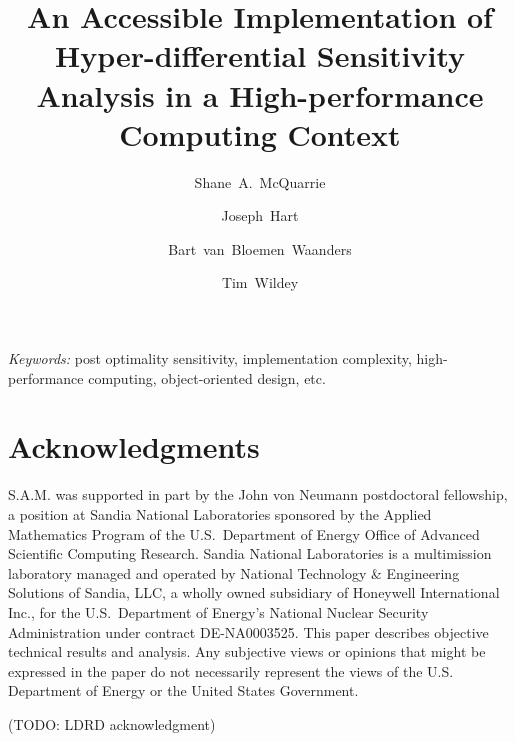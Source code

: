 \documentclass[10pt]{article}
\title{\Large\textbf{An Accessible Implementation of Hyper-differential Sensitivity Analysis in a High-performance Computing Context}}
\author[1]{Shane~A.~McQuarrie}
\author[1]{Joseph~Hart}
\author[1]{Bart~van~Bloemen~Waanders}
\author[2]{Tim~Wildey}
\affil[1]{\normalsize Scientific Machine Learning, Sandia National Laboratories}
\affil[1]{\normalsize Computational Mathematics, Sandia National Laboratories}
\date{}
\begin{document}
\thispagestyle{empty}

\maketitle

\vspace{-.5in}

\begin{abstract}
\noindent

\end{abstract}

\vspace{2mm}
\noindent \emph{Keywords:} post optimality sensitivity, implementation complexity, high-performance computing, object-oriented design, etc.




\section*{Acknowledgments}

S.A.M. was supported in part by the John von Neumann postdoctoral fellowship, a position at Sandia National Laboratories sponsored by the Applied Mathematics Program of the U.S.~Department of Energy Office of Advanced Scientific Computing Research.
Sandia National Laboratories is a multimission laboratory managed and operated by National Technology \& Engineering Solutions of Sandia, LLC, a wholly owned subsidiary of Honeywell International Inc., for the U.S.~Department of Energy's National Nuclear Security Administration under contract DE-NA0003525.
This paper describes objective technical results and analysis. Any subjective views or opinions that might be expressed in the paper do not necessarily represent the views of the U.S. Department of Energy or the United States Government.

(TODO: LDRD acknowledgment)

\begin{appendices}

\end{appendices}



\end{document}
